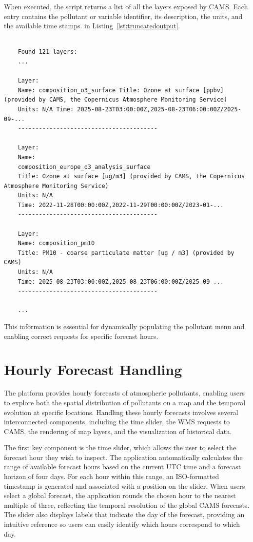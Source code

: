 When executed, the script returns a list of all the layers exposed by CAMS. Each entry contains the pollutant or variable identifier, its description, the units, and the available time stamps. in Listing~\ref{lst:truncatedoutput}.

\begin{lstlisting}[caption={Truncated output of the GetCapabilities request}, label={lst:truncatedoutput}]

	Found 121 layers:
	...
	
	Layer: 
	Name: composition_o3_surface Title: Ozone at surface [ppbv] (provided by CAMS, the Copernicus Atmosphere Monitoring Service)
	Units: N/A Time: 2025-08-23T03:00:00Z,2025-08-23T06:00:00Z/2025-09-... 
	---------------------------------------- 
	
	Layer: 
	Name: 
	composition_europe_o3_analysis_surface 
	Title: Ozone at surface [ug/m3] (provided by CAMS, the Copernicus Atmosphere Monitoring Service) 
	Units: N/A 
	Time: 2022-11-28T00:00:00Z,2022-11-29T00:00:00Z/2023-01-... 
	---------------------------------------- 
	
	Layer: 
	Name: composition_pm10 
	Title: PM10 - coarse particulate matter [ug / m3] (provided by CAMS) 
	Units: N/A 
	Time: 2025-08-23T03:00:00Z,2025-08-23T06:00:00Z/2025-09-... 
	----------------------------------------
	
	...
\end{lstlisting}

This information is essential for dynamically populating the pollutant menu and enabling correct requests for specific forecast hours.


\section{Hourly Forecast Handling}

The platform provides hourly forecasts of atmospheric pollutants, enabling users to explore both the spatial distribution of pollutants on a map and the temporal evolution at specific locations. Handling these hourly forecasts involves several interconnected components, including the time slider, the WMS requests to CAMS, the rendering of map layers, and the visualization of historical data.

The first key component is the time slider, which allows the user to select the forecast hour they wish to inspect. The application automatically calculates the range of available forecast hours based on the current UTC time and a forecast horizon of four days. For each hour within this range, an ISO-formatted timestamp is generated and associated with a position on the slider. When users select a global forecast, the application rounds the chosen hour to the nearest multiple of three, reflecting the temporal resolution of the global CAMS forecasts. The slider also displays labels that indicate the day of the forecast, providing an intuitive reference so users can easily identify which hours correspond to which day.



